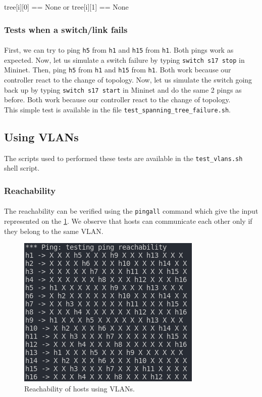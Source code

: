 \documentclass[a4paper, 11pt, oneside]{article}
\begin{document}
\begin{table}[H]
tree[i][0] == None or tree[i][1] == None
\subsubsection{Tests when a switch/link fails}
\paragraph{}First, we can try to ping \texttt{h5} from \texttt{h1} and \texttt{h15} from \texttt{h1}. Both pings work as expected. Now, let us simulate a switch failure by typing \texttt{switch s17 stop} in Mininet. Then, ping \texttt{h5} from \texttt{h1} and \texttt{h15} from \texttt{h1}. Both work because our controller react to the change of topology. Now, let us simulate the switch going back up by typing \texttt{switch s17 start} in Mininet and do the same 2 pings as before. Both work because our controller react to the change of topology.\\
This simple test is available in the file \texttt{test\_spanning\_tree\_failure.sh}.

\subsection{Using VLANs}
The scripts used to performed these tests are available in the \texttt{test\_vlans.sh} shell script.
\subsubsection{Reachability}

\paragraph{}The reachability can be verified using the \texttt{pingall} command which give the input represented on the \ref{VLANs_reach}. We observe that hosts can communicate each other only if they belong to the same VLAN.

\begin{figure}[H]
\center
\includegraphics[scale = 2]{VLANs/VLANs_reach.png}
\caption{Reachability of hosts using VLANs.}
\label{VLANs_reach}
\end{figure}


\end{table}
\end{document}
